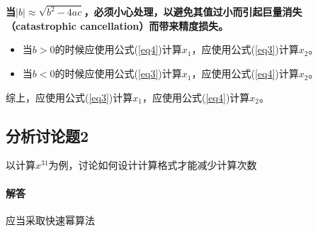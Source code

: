 \textbf{当$|b| \approx \sqrt{b^2 - 4ac}$，必须小心处理，以避免其值过小而引起巨量消失（catastrophic cancellation）而带来精度损失。}

\begin{itemize}
	\item 当$b > 0$的时候应使用公式(\ref{eq4})计算$x_1$，应使用公式(\ref{eq3})计算$x_2$。
	\item 当$b < 0$的时候应使用公式(\ref{eq3})计算$x_1$，应使用公式(\ref{eq4})计算$x_2$。
\end{itemize}



综上，应使用公式(\ref{eq3})计算$x_1$，应使用公式(\ref{eq4})计算$x_2$。



\subsection{分析讨论题2}

以计算$x^31$为例，讨论如何设计计算格式才能减少计算次数

\paragraph{解答}

应当采取快速幂算法



